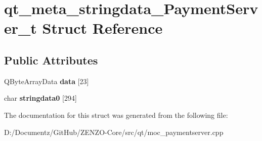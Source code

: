 \hypertarget{structqt__meta__stringdata___payment_server__t}{}\section{qt\+\_\+meta\+\_\+stringdata\+\_\+\+Payment\+Server\+\_\+t Struct Reference}
\label{structqt__meta__stringdata___payment_server__t}
\subsection*{Public Attributes}
\begin{DoxyCompactItemize}
\item 
\mbox{\label{structqt__meta__stringdata___payment_server__t_ae85a30bc81e607eb1e5c3742df98d0c6}} 
Q\+Byte\+Array\+Data {\bfseries data} \mbox{[}23\mbox{]}
\item 
\mbox{\label{structqt__meta__stringdata___payment_server__t_aeb07385e1d38c729b5034adce4b52bc9}} 
char {\bfseries stringdata0} \mbox{[}294\mbox{]}
\end{DoxyCompactItemize}


The documentation for this struct was generated from the following file\+:\begin{DoxyCompactItemize}
\item 
D\+:/\+Documentz/\+Git\+Hub/\+Z\+E\+N\+Z\+O-\/\+Core/src/qt/moc\+\_\+paymentserver.\+cpp\end{DoxyCompactItemize}
